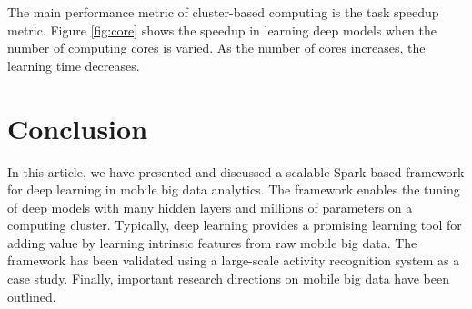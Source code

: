 \documentclass[14pt, a4paper]{extarticle}
\begin{document}
The main performance metric
of cluster-based computing is the task speedup metric. Figure \ref{fig:core}
shows the speedup in learning deep models when the number of
computing cores is varied. As the number of cores increases, the
learning time decreases.

\newpage

\section{Conclusion}

In this article, we have presented and discussed a scalable
Spark-based framework for deep learning in mobile big data
analytics. The framework enables the tuning of deep models
with many hidden layers and millions of parameters on a computing cluster. Typically, deep learning provides a promising
learning tool for adding value by learning intrinsic features
from raw mobile big data. The framework has been validated
using a large-scale activity recognition system as a case study.
Finally, important research directions on mobile big data have
been outlined.
\end{document}
